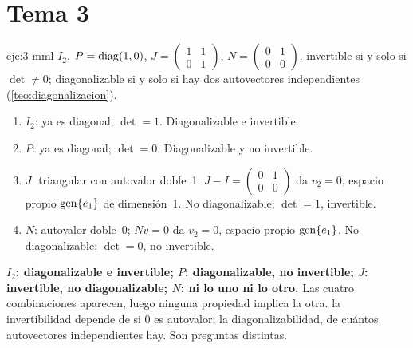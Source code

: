 \section{Tema 3}

\begin{solucion}{eje:3-mml}
\datos $I_2$, $P=\operatorname{diag}(1,0)$, $J=\begin{pmatrix}1&1\\0&1\end{pmatrix}$, $N=\begin{pmatrix}0&1\\0&0\end{pmatrix}$.
\planteamiento invertible si y solo si $\det\ne 0$; diagonalizable si y solo si hay dos autovectores independientes (\cref{teo:diagonalizacion}).
\pasos
\begin{enumerate}[label=\arabic*.]
  \item $I_2$: ya es diagonal; $\det=1$. Diagonalizable e invertible.
  \item $P$: ya es diagonal; $\det=0$. Diagonalizable y no invertible.
  \item $J$: triangular con autovalor doble~1. $J-I=\begin{pmatrix}0&1\\0&0\end{pmatrix}$ da $v_2=0$, espacio propio $\operatorname{gen}\{e_1\}$ de dimensión~1. No diagonalizable; $\det=1$, invertible.
  \item $N$: autovalor doble~0; $Nv=0$ da $v_2=0$, espacio propio $\operatorname{gen}\{e_1\}$. No diagonalizable; $\det=0$, no invertible.
\end{enumerate}
\resultado \textbf{$I_2$: diagonalizable e invertible; $P$: diagonalizable, no invertible; $J$: invertible, no diagonalizable; $N$: ni lo uno ni lo otro.} Las cuatro combinaciones aparecen, luego ninguna propiedad implica la otra.
\comprobacion la invertibilidad depende de si $0$ es autovalor; la diagonalizabilidad, de cuántos autovectores independientes hay. Son preguntas distintas.
\end{solucion}

